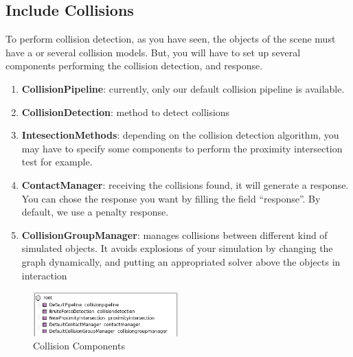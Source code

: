 \subsection{Include Collisions}
To perform collision detection, as you have seen, the objects of the scene must have a or several collision models. But, you will have to set up several components performing the collision detection, and response.

\begin{enumerate}
 \item { \bf CollisionPipeline}: currently, only our default collision pipeline is available.
 \item { \bf CollisionDetection}: method to detect collisions
 \item { \bf IntesectionMethods}: depending on the collision detection algorithm, you may have to specify some components to perform the proximity intersection test for example.
 \item { \bf ContactManager}: receiving the collisions found, it will generate a response. You can chose the response you want by filling the field ``response''. By default, we use a penalty response.
 \item { \bf CollisionGroupManager}: manages collisions between different kind of simulated objects. It avoids explosions of your simulation by changing the graph dynamically, and putting an appropriated solver above the objects in interaction
\end{enumerate}

\begin{figure}[htpb]
	\centering
		\includegraphics[width=0.5\textwidth]{Modelling5.jpg}
	\caption{Collision Components}
\end{figure}
